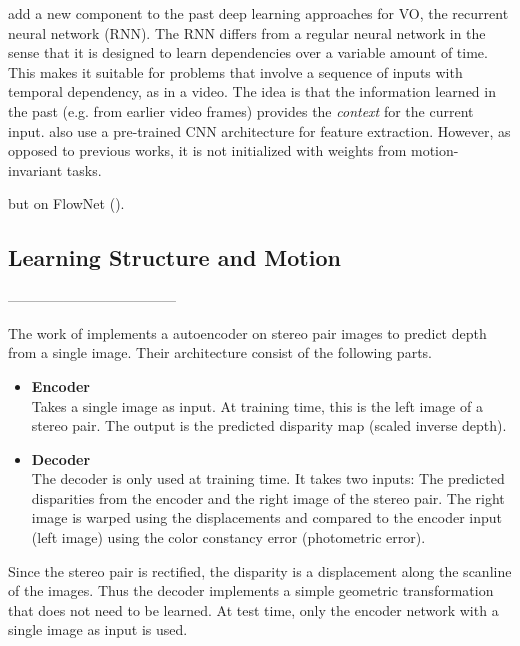 			\cite{wang2017deepvo} add a new component to the past deep learning approaches for VO, the recurrent neural network (RNN).
			The RNN differs from a regular neural network in the sense that it is designed to learn dependencies over a variable amount of time.
			This makes it suitable for problems that involve a sequence of inputs with temporal dependency, as in a video.
			The idea is that the information learned in the past (e.g. from earlier video frames) provides the \emph{context} for the current input.
			\citeauthor{wang2017deepvo} also use a pre-trained CNN architecture for feature extraction.
			However, as opposed to previous works, it is not initialized with weights from motion-invariant tasks. 
			
			but on FlowNet (\cite{dosovitskiy2015flownet}).
			
			
			
		
		
		
		
	
		\subsection{Learning Structure and Motion}
		
		
		
		------------------------------------
		
		The work of \cite{garg2016} implements a autoencoder on stereo pair images to predict depth from a single image.
		Their architecture consist of the following parts.
		\begin{itemize}
			\item \textbf{Encoder}
				\\
				Takes a single image as input. 
				At training time, this is the left image of a stereo pair.
				The output is the predicted disparity map (scaled inverse depth).
			\item \textbf{Decoder}
				\\
				The decoder is only used at training time.
				It takes two inputs: The predicted disparities from the encoder and the right image of the stereo pair.
				The right image is warped using the displacements and compared to the encoder input (left image) using the color constancy error (photometric error).
		\end{itemize}
		Since the stereo pair is rectified, the disparity is a displacement along the scanline of the images.
		Thus the decoder implements a simple geometric transformation that does not need to be learned.
		At test time, only the encoder network with a single image as input is used.
		
